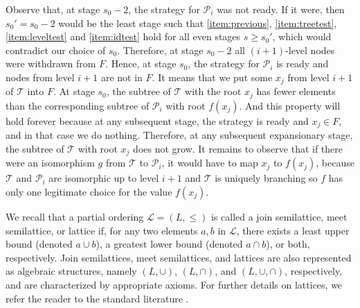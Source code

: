 \documentclass[a4paper,UKenglish,cleveref, autoref, thm-restate]{lipics-v2021}
\begin{document}
\begin{claimproof}
    Observe that, at stage $s_0-2$, the strategy for $\mathcal P_i$ was not ready. If it were, then $s_0' = s_0-2$ would be the least stage such that \eqref{item:previous}, \eqref{item:treetest}, \eqref{item:leveltest} and \eqref{item:idtest} hold for all even stages $s \geq s_0'$, which would contradict our choice of $s_0$. Therefore, at stage $s_0 -2$ all $(i+1)$-level nodes were withdrawn from $F$. Hence, at stage $s_0$, the strategy for $\mathcal P_i$ is ready and nodes from level $i+1$ are not in $F$. It means that we put some $x_j$ from level $i+1$ of $\mathcal T$ into $F$. At stage $s_0$, the subtree of $\mathcal T$ with the root $x_j$ has fewer elements than the corresponding subtree of $\mathcal P_{i}$ with root $f(x_j)$. And this property will hold forever because at any subsequent stage, the strategy is ready and $x_j \in F$, and in that case we do nothing. Therefore, at any subsequent expansionary stage, the subtree of $\mathcal T$ with root $x_j$ does not grow. It remains to observe that if there were an isomorphism $g$ from $\mathcal T$ to $\mathcal P_i$, it would have to map $x_j$ to $f(x_j)$, because $\mathcal T$ and $\mathcal P_i$ are isomorphic up to level $i+1$ and $\mathcal T$ is uniquely branching so $f$ has only one legitimate choice for the value $f(x_j)$.    
\end{claimproof}

We recall that a partial ordering $\mathcal{L} = (L, \leq)$ is called a join semilattice, meet semilattice, or lattice if, for any two elements $a, b$ in $\mathcal{L}$, there exists a least upper bound (denoted $a \cup b$), a greatest lower bound (denoted $a \cap b$), or both, respectively.  Join semilattices, meet semilattices, and lattices are also represented as algebraic structures, namely $(L, \cup)$, $(L, \cap)$, and $(L, \cup, \cap)$, respectively, and are characterized by appropriate axioms.  For further details on lattices, we refer the reader to the standard literature \cite{birkhoff_lattice_1940}. 
\end{document}
